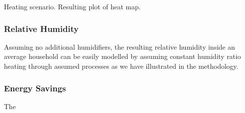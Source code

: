 Heating scenario. Resulting plot of heat map. 
\subsubsection{Relative Humidity}
	Assuming no additional humidifiers, the resulting relative humidity inside an average household can be easily modelled by assuming constant humidity ratio heating through assumed processes as we have illustrated in the methodology.
\subsubsection{Energy Savings}
	The 